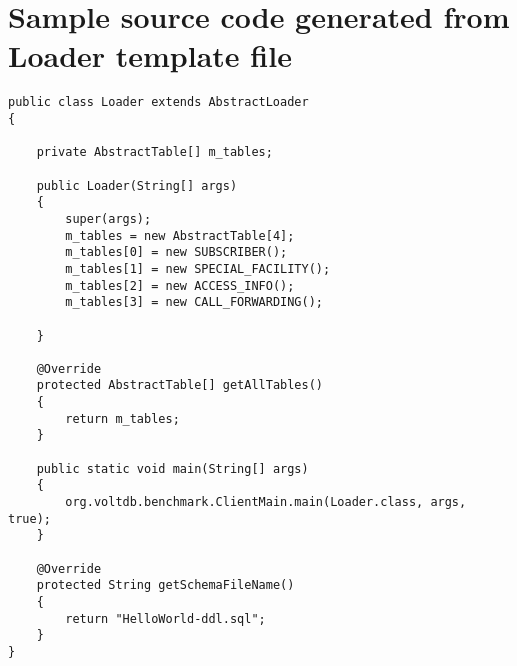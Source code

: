 \documentclass[a4paper,10pt]{article}
\begin{document}
\section{Sample source code generated from Loader template file}
\begin{verbatim}
public class Loader extends AbstractLoader 
{

    private AbstractTable[] m_tables;

    public Loader(String[] args) 
    {
        super(args);
        m_tables = new AbstractTable[4];
        m_tables[0] = new SUBSCRIBER();
        m_tables[1] = new SPECIAL_FACILITY();
        m_tables[2] = new ACCESS_INFO();
        m_tables[3] = new CALL_FORWARDING();
    
    }

    @Override
    protected AbstractTable[] getAllTables()
    {
        return m_tables;
    }

    public static void main(String[] args) 
    {
        org.voltdb.benchmark.ClientMain.main(Loader.class, args, true);
    }

    @Override
    protected String getSchemaFileName()
    {
        return "HelloWorld-ddl.sql";
    }
}
\end{verbatim}
\end{document}
